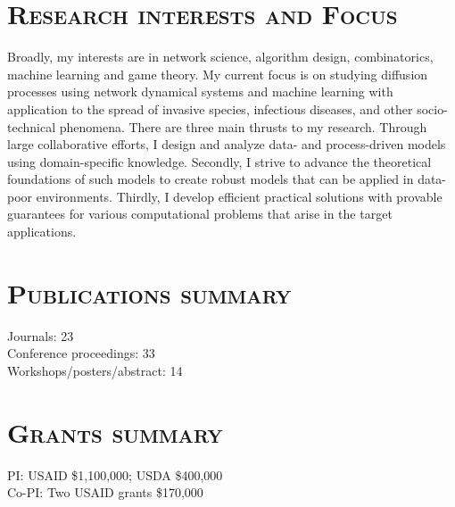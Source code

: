 \documentclass[margin,10pt]{res} %
\begin{document}
\begin{resume}
\section{\textnormal{\textsc{Research interests and Focus}}}
Broadly, my interests are in network science, algorithm design,
combinatorics, machine learning and game theory. My current focus is on studying diffusion
processes using network dynamical systems and machine learning with
application to the spread of invasive species, infectious diseases, and
other socio-technical phenomena. There are three main thrusts to my
research.  Through large collaborative efforts, I design and analyze data- and
process-driven models using domain-specific knowledge. Secondly, I strive
to advance the theoretical foundations of such models to create robust
models that can be applied in data-poor environments. Thirdly, I develop
efficient practical solutions with provable guarantees for various
computational problems that arise in the target applications.\\

\section{\textnormal{\textsc{Publications summary}}}
Journals: 23\\
Conference proceedings: 33\\
Workshops/posters/abstract: 14\\

\section{\textnormal{\textsc{Grants summary}}}
PI: USAID \$1,100,000; USDA \$400,000\\
Co-PI: Two USAID grants \$170,000


\end{resume}
\end{document}
